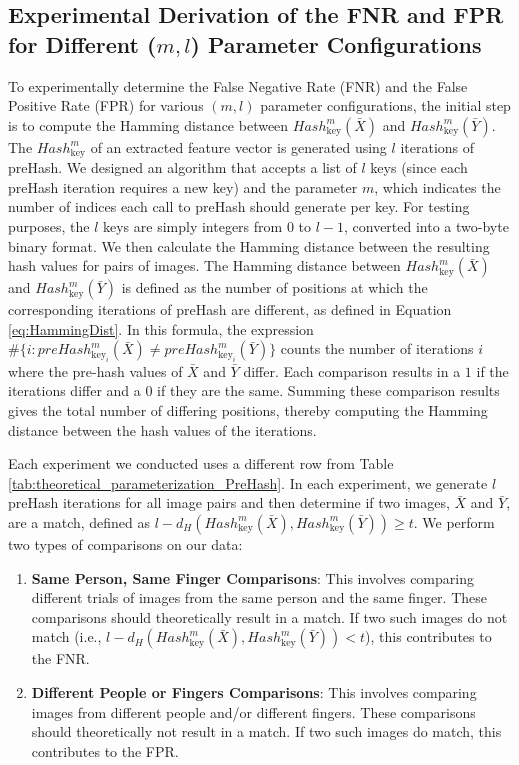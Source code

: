 \newpage
\subsection{Experimental Derivation of the FNR and FPR for Different (\(m, l\)) Parameter Configurations}

To experimentally determine the False Negative Rate (FNR) and the False Positive Rate (FPR) for various \((m, l)\) parameter configurations, the initial step is to compute the Hamming distance between \( Hash_{\text{key}}^m(\bar{X}) \) and \( Hash_{\text{key}}^m(\bar{Y}) \). The \( Hash_{\text{key}}^m \) of an extracted feature vector is generated using \( l \) iterations of preHash. We designed an algorithm that accepts a list of \( l \) keys (since each preHash iteration requires a new key) and the parameter \( m \), which indicates the number of indices each call to preHash should generate per key. For testing purposes, the \( l \) keys are simply integers from 0 to \( l-1 \), converted into a two-byte binary format. We then calculate the Hamming distance between the resulting hash values for pairs of images. The Hamming distance between \( Hash_{\text{key}}^m(\bar{X}) \) and \( Hash_{\text{key}}^m(\bar{Y}) \) is defined as the number of positions at which the corresponding iterations of preHash are different, as defined in Equation \ref{eq:HammingDist}. In this formula, the expression \( \# \{ i : preHash_{\text{key}_i}^m(\bar{X}) \neq preHash_{\text{key}_i}^m(\bar{Y}) \} \) counts the number of iterations \( i \) where the pre-hash values of \( \bar{X} \) and \( \bar{Y} \) differ. Each comparison results in a \(1\) if the iterations differ and a \(0\) if they are the same. Summing these comparison results gives the total number of differing positions, thereby computing the Hamming distance between the hash values of the iterations.


Each experiment we conducted uses a different row from Table \ref{tab:theoretical_parameterization_PreHash}. In each experiment, we generate \( l \) preHash iterations for all image pairs and then determine if two images, \(\bar{X}\) and \(\bar{Y}\), are a match, defined as \( l - d_H(Hash_{\text{key}}^m(\bar{X}), Hash_{\text{key}}^m(\bar{Y})) \geq t \). We perform two types of comparisons on our data:


\begin{enumerate}
    \item \textbf{Same Person, Same Finger Comparisons}: This involves comparing different trials of images from the same person and the same finger. These comparisons should theoretically result in a match. If two such images do not match (i.e., \( l - d_H(Hash_{\text{key}}^m(\bar{X}), Hash_{\text{key}}^m(\bar{Y})) < t \)), this contributes to the FNR.
    \item \textbf{Different People or Fingers Comparisons}: This involves comparing images from different people and/or different fingers. These comparisons should theoretically not result in a match. If two such images do match, this contributes to the FPR.
\end{enumerate}

